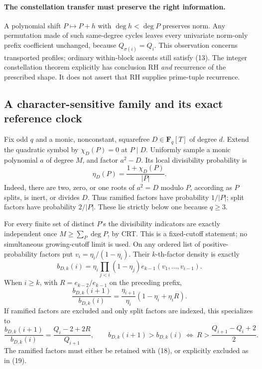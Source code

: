 \documentclass[11pt]{article}
\newcommand{\F}{\mathbf F}
\begin{document}
\paragraph{The constellation transfer must preserve the right information.}
A polynomial shift \(P\mapsto P+h\) with \(\deg h<\deg P\) preserves norm.
Any permutation made of such same-degree cycles leaves every univariate
norm-only prefix coefficient unchanged, because \(Q_{\sigma(i)}=Q_i\).
This observation concerns transported profiles; ordinary within-block
ascents still satisfy (13). The integer constellation theorem explicitly
has conclusion RH \emph{and} recurrence of the prescribed shape.
It does not assert that RH supplies prime-tuple recurrence.

\subsection{A character-sensitive family and its exact reference clock}

Fix odd \(q\) and a monic, nonconstant, squarefree
\(D\in\F_q[T]\) of degree \(d\). Extend the quadratic symbol by
\(\chi_D(P)=0\) at \(P\mid D\). Uniformly sample a monic polynomial
\(a\) of degree \(M\), and factor \(a^2-D\). Its local divisibility
probability is
\[
 \eta_D(P)=\frac{1+\chi_D(P)}{|P|}.
\]
Indeed, there are two, zero, or one roots of \(a^2=D\) modulo \(P\),
according as \(P\) splits, is inert, or divides \(D\). Thus ramified
factors have probability \(1/|P|\); split factors have probability
\(2/|P|\). These lie strictly below one because \(q\geq3\).

For every finite set of distinct \(P\)'s the divisibility indicators
are exactly independent once \(M\geq\sum_P\deg P\), by CRT. This is a
fixed-cutoff statement; no simultaneous growing-cutoff limit is used.
On any ordered list of positive-probability factors put
\(v_i=\eta_i/(1-\eta_i)\). Their \(k\)-th-factor density is exactly
\[
 b_{D,k}(i)=\eta_i\prod_{j<i}(1-\eta_j)
                        e_{k-1}(v_1,\ldots,v_{i-1}).
\]
When \(i\geq k\), with \(R=e_{k-2}/e_{k-1}\) on the preceding prefix,
\[
 \frac{b_{D,k}(i+1)}{b_{D,k}(i)}
  =\frac{\eta_{i+1}}{\eta_i}(1-\eta_i+\eta_i R).       \tag{18}
\]
If ramified factors are excluded and only split factors are indexed,
this specializes to
\[
 \frac{b_{D,k}(i+1)}{b_{D,k}(i)}
       =\frac{Q_i-2+2R}{Q_{i+1}},\qquad
 b_{D,k}(i+1)>b_{D,k}(i)
 \ \Longleftrightarrow\
 R>\frac{Q_{i+1}-Q_i+2}{2}.                         \tag{19}
\]
The ramified factors must either be retained with (18), or explicitly
excluded as in (19).
\end{document}
